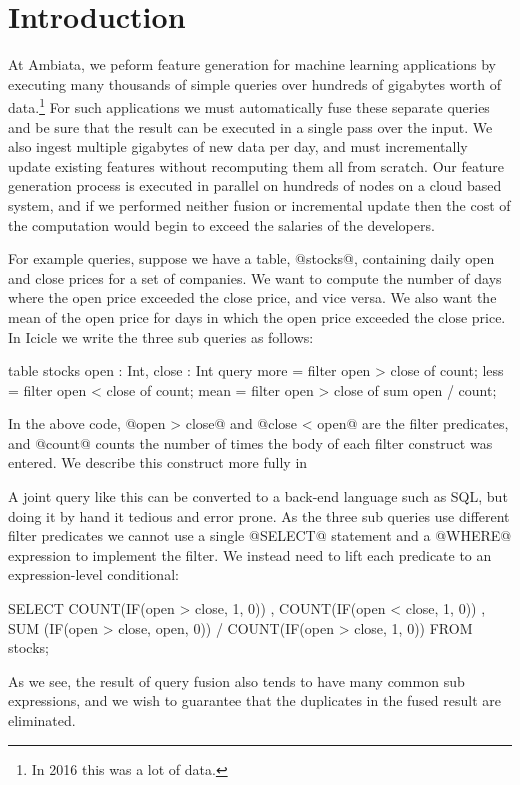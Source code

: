 \section{Introduction}
\label{s:Introduction}

At Ambiata, we peform feature generation for machine learning applications by executing many thousands of simple queries over hundreds of gigabytes worth of data.\footnote{In 2016 this was a lot of data.} For such applications we must automatically fuse these separate queries and be sure that the result can be executed in a single pass over the input. We also ingest multiple gigabytes of new data per day, and must incrementally update existing features without recomputing them all from scratch. Our feature generation process is executed in parallel on hundreds of nodes on a cloud based system, and if we performed neither fusion or incremental update then the cost of the computation would begin to exceed the salaries of the developers.

For example queries, suppose we have a table, @stocks@, containing daily open and close prices for a set of companies. We want to compute the number of days where the open price exceeded the close price, and vice versa. We also want the mean of the open price for days in which the open price exceeded the close price. In Icicle we write the three sub queries as follows:

\begin{code}
table stocks { open : Int, close : Int }
query 
  more  = filter open > close of count;
  less  = filter open < close of count;
  mean  = filter open > close of sum open / count;
\end{code}
In the above code, @open > close@ and @close < open@ are the filter predicates, and @count@ counts the number of times the body of each filter construct was entered. We describe this construct more fully in \REF

A joint query like this can be converted to a back-end language such as SQL, but doing it by hand it tedious and error prone. As the three sub queries use different filter predicates we cannot use a single @SELECT@ statement and a @WHERE@ expression to implement the filter. We instead need to lift each predicate to an expression-level conditional:
\begin{code}
  SELECT COUNT(IF(open > close, 1, 0))
       , COUNT(IF(open < close, 1, 0))
       , SUM  (IF(open > close, open, 0))
       / COUNT(IF(open > close, 1, 0))
  FROM stocks;
\end{code}
As we see, the result of query fusion also tends to have many common sub expressions, and we wish to guarantee that the duplicates in the fused result are eliminated.

